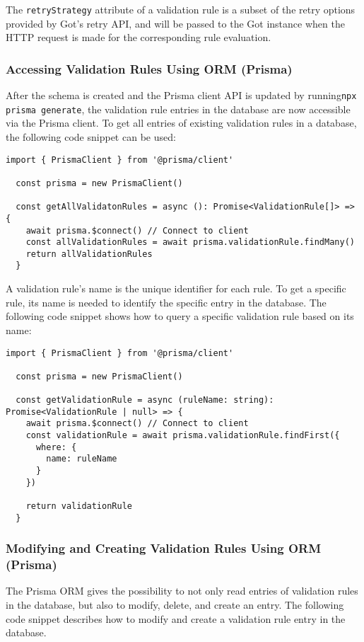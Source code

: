   The \verb;retryStrategy; attribute of a validation rule is a subset of the retry options provided by Got's retry API, and will be passed to the Got instance when the HTTP request is made for the corresponding rule evaluation. 

 \subsubsection{Accessing Validation Rules Using ORM (Prisma)} 
  After the schema is created and the Prisma client API is updated by running\newline\verb;npx prisma generate;, the validation rule entries in the database are now accessible via the Prisma client. To get all entries of existing validation rules in a database, the following code snippet can be used:

  \begin{lstlisting}[style=es6, caption={Getting all existing validation rules in the database (TypeScript)}]
  import { PrismaClient } from '@prisma/client'

  const prisma = new PrismaClient()

  const getAllValidatonRules = async (): Promise<ValidationRule[]> => {
    await prisma.$connect() // Connect to client
    const allValidationRules = await prisma.validationRule.findMany()
    return allValidationRules
  }
  \end{lstlisting}
  
  A validation rule's name is the unique identifier for each rule. To get a specific rule, its name is needed to identify the specific entry in the database. The following code snippet shows how to query a specific validation rule based on its name:

  \begin{lstlisting}[style=es6, caption={Getting an existing validation rule based on its name in the database (TypeScript)}]
  import { PrismaClient } from '@prisma/client'

  const prisma = new PrismaClient()

  const getValidationRule = async (ruleName: string): Promise<ValidationRule | null> => {
    await prisma.$connect() // Connect to client
    const validationRule = await prisma.validationRule.findFirst({
      where: {
        name: ruleName
      }
    })
    
    return validationRule
  }
  \end{lstlisting}  

 \subsubsection{Modifying and Creating Validation Rules Using ORM (Prisma)}
  The Prisma ORM gives the possibility to not only read entries of validation rules in the database, but also to modify, delete, and create an entry. The following code snippet describes how to modify and create a validation rule entry in the database. 

